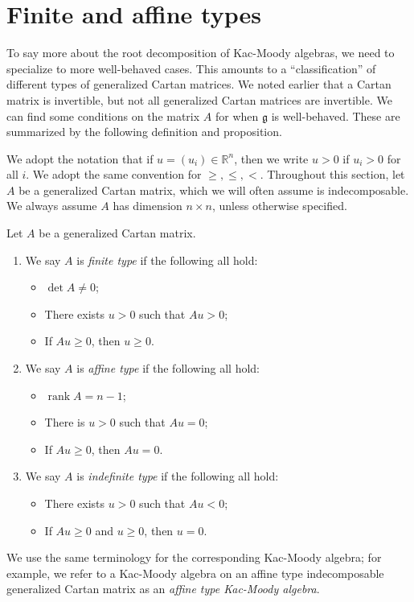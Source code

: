 \documentclass[11pt, letterpaper]{article}
\theoremstyle{plain}
\begin{document}
\section{Finite and affine types}

To say more about the root decomposition of Kac-Moody algebras, we need to specialize to more well-behaved cases. This amounts to a ``classification'' of different types of generalized Cartan matrices. We noted earlier that a Cartan matrix is invertible, but not all generalized Cartan matrices are invertible. We can find some conditions on the matrix $A$ for when $\mathfrak{g} $ is well-behaved. These are summarized by the following definition and proposition.

We adopt the notation that if $u=(u_i)\in\mathbb{R} ^n$, then we write $u>0$ if $u_i>0$ for all $i$. We adopt the same convention for $\geq ,\leq ,<$. Throughout this section, let $A$ be a generalized Cartan matrix, which we will often assume is indecomposable. We always assume $A$ has dimension $n\times n$, unless otherwise specified.

\begin{definition}\label{dfn:4-1}
	Let $A$ be a generalized Cartan matrix.
	\begin{enumerate}
		\item We say $A$ is \emph{finite type} if the following all hold:
			\begin{itemize}
				\item $\det A \neq 0$;
				\item There exists $u > 0$ such that $Au > 0$;
				\item If $Au \geq 0$, then $u\geq 0$.
			\end{itemize}
		\item We say $A$ is \emph{affine type} if the following all hold:
			\begin{itemize}
				\item $\operatorname{rank} A = n-1$;
				\item There is $u>0$ such that $Au=0$;
				\item If $Au \geq 0$, then $Au=0$.
			\end{itemize}
		\item We say $A$ is \emph{indefinite type} if the following all hold:
			\begin{itemize}
				\item There exists $u>0$ such that $Au<0$;
				\item If $Au\geq 0$ and $u\geq 0$, then $u=0$.
			\end{itemize}
	\end{enumerate}
	We use the same terminology for the corresponding Kac-Moody algebra; for example, we refer to a Kac-Moody algebra on an affine type indecomposable generalized Cartan matrix as an \emph{affine type Kac-Moody algebra}.
\end{definition}
\end{document}
